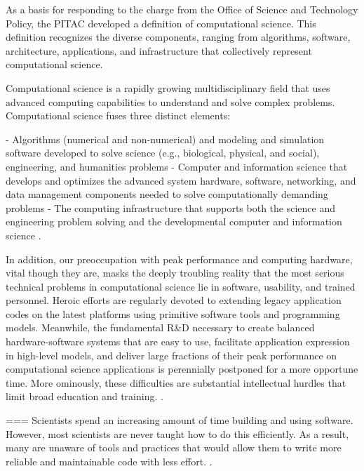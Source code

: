 \begin{citacao}
As a basis for responding to the charge from the Office of Science and Technology Policy, the PITAC developed a definition of computational science. This definition recognizes the diverse components, ranging from algorithms, software, architecture, applications, and infrastructure that collectively represent computational science.

Computational science is a rapidly growing multidisciplinary field that uses advanced computing capabilities to understand and solve complex problems. Computational science fuses three distinct elements:

- Algorithms (numerical and non-numerical) and modeling and simulation software developed to solve science (e.g., biological, physical, and social), engineering, and humanities problems
- Computer and information science that develops and optimizes the advanced system hardware, software, networking, and data management components needed to solve computationally demanding problems
- The computing infrastructure that supports both the science and engineering problem solving and the developmental computer and information science
\cite[pg. 3]{pitac2005}.
\end{citacao}

In addition, our preoccupation with peak performance and computing hardware, vital though they are, masks the deeply troubling reality that the most serious technical problems in computational science lie in software, usability, and trained personnel. Heroic efforts are regularly devoted to extending legacy application codes on the latest platforms using primitive software tools and programming models. Meanwhile, the fundamental R&D necessary to create balanced hardware-software systems that are easy to use, facilitate application expression in high-level models, and deliver large fractions of their peak performance on computational science applications is perennially postponed for a more opportune time. More ominously, these difficulties are substantial intellectual hurdles that limit broad education and training. \cite[pg. 16-17]{pitac2005}.

\cite{wilson2013}
===
Scientists spend an increasing amount of time building and using software. However, most scientists are never taught how to do this efficiently. As a result, many are unaware of tools and practices that would allow them to write more reliable and maintainable code with less effort. \cite[pg. 1]{wilson2013}.



